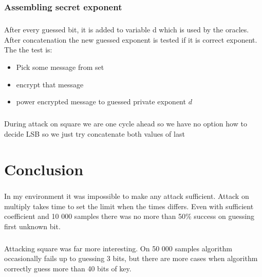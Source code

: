 \documentclass[thesis=B,english]{FITthesis}[2012/10/20]
\begin{document}
{\subsection{Assembling secret exponent}
\paragraph{}{
After every guessed bit, it is added to variable d which is used by the oracles. After concatenation the new guessed exponent is tested if it is correct exponent.
The the test is:}
\begin{itemize}
 \item Pick some message from set
 \item encrypt that message
 \item power encrypted message to guessed private exponent \(d\)
\end{itemize}

\paragraph*{}{
During attack on square we are one cycle ahead so we have no option how to decide LSB so we just try concatenate both values of last  
}

\chapter{Conclusion}

\paragraph*{}{
In my environment it was impossible to make any attack sufficient. Attack on multiply takes time to set the limit when the times differs. Even with sufficient coefficient and 
10 000 samples there was no more than 50\% success on guessing first unknown bit.}

\paragraph{}{
Attacking square was far more interesting. On 50 000 samples algorithm occasionally fails up to guessing 3 bits, but there are more cases when algorithm correctly guess more than 40 bits of key.		
}





\appendix

}
\end{document}

